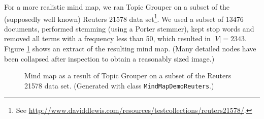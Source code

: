 \documentclass[10pt, a4paper, oneside]{article}
\begin{document}
For a more realistic mind map, we ran Topic Grouper on a subset of the (supposedly well known) Reuters 21578 data set\footnote{See
\href{http://www.daviddlewis.com/resources/testcollections/reuters21578/}{http://www.daviddlewis.com/resources/testcollections/reuters21578/}.}.
We used a subset of 13476 documents, performed stemming (using a Porter stemmer), kept stop words and removed all terms with a frequency less than 50, which resulted in $|V| = 2343$. Figure \ref{mindmap2} shows an extract of the resulting mind map. (Many detailed nodes have been collapsed after inspection to obtain a reasonably sized image.)

\begin{figure}
\caption{Mind map as a result of Topic Grouper on a subset of the Reuters 21578 data set. (Generated with class \texttt{MindMapDemoReuters}.)}
\label{mindmap2}
\end{figure}
\end{document}
